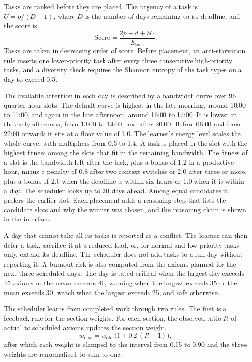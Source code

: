 Tasks are ranked before they are placed. The urgency of a task is $U = p/(D+1)$, where $D$ is the number of days remaining to its deadline, and the score is
\begin{equation}
  \mathrm{Score} = \frac{2p + d + 3U}{E_{\mathrm{task}}}.
  \label{eq:axiom-score}
\end{equation}
Tasks are taken in decreasing order of score. Before placement, an anti-starvation rule inserts one lower-priority task after every three consecutive high-priority tasks, and a diversity check requires the Shannon entropy of the task types on a day to exceed 0.5.

The available attention in each day is described by a bandwidth curve over 96 quarter-hour slots. The default curve is highest in the late morning, around 10:00 to 11:00, and again in the late afternoon, around 16:00 to 17:00. It is lowest in the early afternoon, from 13:00 to 14:00, and after 20:00. Before 06:00 and from 22:00 onwards it sits at a floor value of 1.0. The learner's energy level scales the whole curve, with multipliers from 0.5 to 1.4. A task is placed in the slot with the highest fitness among the slots that fit in the remaining bandwidth. The fitness of a slot is the bandwidth left after the task, plus a bonus of 1.2 in a productive hour, minus a penalty of 0.8 after two context switches or 2.0 after three or more, plus a bonus of 2.0 when the deadline is within six hours or 1.0 when it is within a day. The scheduler looks up to 30 days ahead. Among equal candidates it prefers the earlier slot. Each placement adds a reasoning step that lists the candidate slots and why the winner was chosen, and the reasoning chain is shown in the interface.

A day that cannot take all its tasks is reported as a conflict. The learner can then defer a task, sacrifice it at a reduced load, or, for normal and low priority tasks only, extend its deadline. The scheduler does not add tasks to a full day without reporting it. A burnout risk is also computed from the axioms planned for the next three scheduled days. The day is rated critical when the largest day exceeds 45 axioms or the mean exceeds 40, warning when the largest exceeds 35 or the mean exceeds 30, watch when the largest exceeds 25, and safe otherwise.

The scheduler learns from completed work through two rules. The first is a feedback rule for the section weights. For each section, the observed ratio $R$ of actual to scheduled axioms updates the section weight,
\begin{equation}
  w_{\mathrm{new}} = w_{\mathrm{old}}\,\bigl(1 + 0.2\,(R - 1)\bigr),
  \label{eq:axiom-feedback}
\end{equation}
after which each weight is clamped to the interval from 0.05 to 0.90 and the three weights are renormalised to sum to one.

